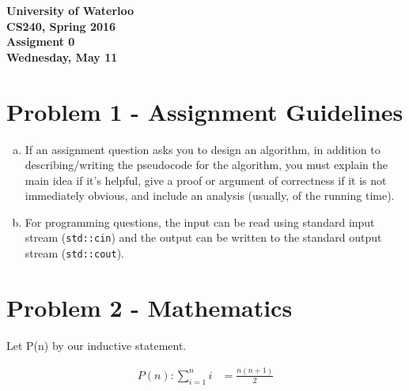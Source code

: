 \documentclass[12pt]{article}
\begin{document}
\begin{center}
{\Large\bf University of Waterloo}\\
\vspace{3mm}
{\Large\bf CS240, Spring 2016}\\
\vspace{2mm}
{\Large\bf Assigment 0}\\
\vspace{3mm}
\textbf{Wednesday, May 11}
\end{center}

\def\question#1{\item[\bf #1.]}
\def\part#1{\item[\bf #1)]}
\newcommand{\pc}[1]{\mbox{\textbf{#1}}} %

\section*{Problem 1 - Assignment Guidelines}

\begin{enumerate}[a)]
    \item If an assignment question asks you to design an algorithm, in addition
to describing/writing the pseudocode for the algorithm, you must explain the main idea if it's helpful, give a proof or argument of correctness if it is not immediately obvious, and include an analysis (usually, of the running time).

    \item For programming questions, the input can be read using standard input stream (\texttt{std::cin}) and the output can be written to the standard output stream (\texttt{std::cout}).
\end{enumerate}

\section*{Problem 2 - Mathematics}

Let P(n) by our inductive statement.

\begin{align*}
P(n): \sum_{i = 1}^{n} i &= \frac{n(n+1)}{2}
\end{align*}
\end{document}
